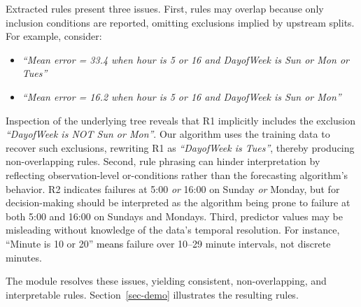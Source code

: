 \documentclass[]{interact}
\newcommand{\galit}[1]{\textcolor{black}{#1}}
\newcommand{\spacingset}[1]{}
\theoremstyle{definition}
\begin{document}
Extracted rules present three issues. First, rules may overlap because only inclusion conditions are reported, omitting exclusions implied by upstream splits.
For example, consider:

{\spacingset{1}
\begin{itemize}
    \setlength{\itemsep}{0pt}
    \setlength{\parskip}{0pt}
    \setlength{\topsep}{2pt}
    \item[(R1)] \textit{``Mean error = 33.4 when hour is 5 or 16 and DayofWeek is Sun or Mon or Tues''}
    \item[(R2)] \textit{``Mean error = 16.2 when hour is 5 or 16 and DayofWeek is Sun or Mon''}
\end{itemize}}
Inspection of the underlying tree reveals that R1 implicitly includes the exclusion \textit{``DayofWeek is NOT Sun or Mon''}. Our algorithm uses the training data to recover such exclusions, rewriting R1 as \textit{``DayofWeek is Tues''}, thereby producing non-overlapping rules. Second, rule phrasing can hinder interpretation by reflecting observation-level or-conditions rather than the forecasting algorithm’s behavior. R2 indicates failures at 5:00 \emph{or} 16:00 on Sunday \emph{or} Monday, but for decision-making should be interpreted as the algorithm being prone to failure at both 5:00 and 16:00 on Sundays and Mondays. Third, predictor values may be misleading without knowledge of the data’s temporal resolution. For instance, “Minute is 10 or 20” \galit{means} %
failure over 10–29 minute intervals, not discrete minutes.

The module resolves these issues, yielding consistent, non-overlapping, and interpretable rules. Section~\ref{sec-demo} illustrates the resulting rules.


\end{document}
